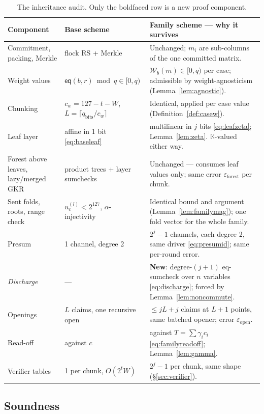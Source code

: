 \documentclass[11pt]{article}
\newcommand{\K}{\mathbb{K}}            %
\newcommand{\eq}{\mathsf{eq}}
\newcommand{\cw}{c_w}
\newcommand{\Wc}{\mathcal{W}}          %
\theoremstyle{plain}
\theoremstyle{definition}
\theoremstyle{remark}
\begin{document}
\begin{table}[ht]\centering\small
\begin{tabular}{@{}p{}p{}p{}@{}}
\toprule
\textbf{Component} & \textbf{Base scheme} & \textbf{Family scheme --- why it survives}\\
\midrule
Commitment, packing, Merkle & flock RS + Merkle & Unchanged; $m_i$ are sub-columns of the one committed matrix.\\[2pt]
Weight values & $\eq(b,r)\bmod q\in[0,q)$ & $\Wc_b(m)\in[0,q)$ per case; admissible by weight-agnosticism (Lemma~\ref{lem:agnostic}).\\[2pt]
Chunking & $\cw=127{-}t{-}W$, $L=\lceil q_{\mathrm{bits}}/\cw\rceil$ & Identical, applied per case value (Definition~\ref{def:casew}).\\[2pt]
Leaf layer & affine in 1 bit \eqref{eq:baseleaf} & multilinear in $j$ bits \eqref{eq:leafzeta}; Lemma~\ref{lem:zeta}. $\K$-valued either way.\\[2pt]
Forest above leaves, lazy/merged GKR & product trees + layer sumchecks & Unchanged --- consumes leaf values only; same error $\varepsilon_{\mathrm{forest}}$ per chunk.\\[2pt]
Sent folds, roots, range check & $u^{(l)}_c<2^{127}$, $\alpha$-injectivity & Identical bound and argument (Lemma~\ref{lem:familymag}); one fold vector for the whole family.\\[2pt]
Presum & 1 channel, degree 2 & $2^{j}{-}1$ channels, each degree 2, same driver \eqref{eq:presumid}; same per-round error.\\[2pt]
\emph{Discharge} & --- & \textbf{New}: degree-$(j{+}1)$ eq-sumcheck over $n$ variables \eqref{eq:discharge}; forced by Lemma~\ref{lem:noncommute}.\\[2pt]
Openings & $L$ claims, one recursive open & $\le jL+j$ claims at $L{+}1$ points, same batched opener; error $\varepsilon_{\mathrm{open}}$.\\[2pt]
Read-off & against $c$ & against $T=\sum\gamma_ic_i$ \eqref{eq:familyreadoff}; Lemma~\ref{lem:gamma}.\\[2pt]
Verifier tables & 1 per chunk, $O(2^tW)$ & $2^{j}{-}1$ per chunk, same shape (\S\ref{sec:verifier}).\\
\bottomrule
\end{tabular}
\caption{The inheritance audit. Only the boldfaced row is a new proof
component.}\label{tab:inherit}
\end{table}

\subsection{Soundness}
\end{document}
